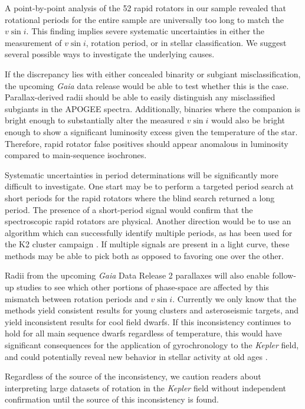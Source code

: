 \documentclass[manuscript]{aastex6}
\newcommand{\vsini}{\ensuremath{v \sin i}}
\newcommand{\Kepler}{\mbox{\textit{Kepler}}}
\newcommand{\Gaia}{\mbox{\textit{Gaia}}}
\begin{document}
A point-by-point analysis of the 52 rapid rotators in our sample revealed that
rotational periods for the entire sample are universally too long to match the 
\vsini{}. This finding implies severe systematic uncertainties in either the
measurement of \vsini{}, rotation period, or in stellar classification. We
suggest several possible ways to investigate the underlying causes.

If the discrepancy lies with either concealed binarity or subgiant
misclassification, the upcoming \Gaia{} data release would be able to
test whether this is the case. Parallax-derived radii should be able to
easily distinguish any misclassified subgiants in the APOGEE spectra.
Additionally, binaries where the companion is bright enough to
substantially alter the measured \vsini{} would also be bright enough to
show a significant luminosity excess given the temperature of the star.
Therefore, rapid rotator false positives should appear anomalous in
luminosity compared to main-sequence isochrones.

Systematic uncertainties in period determinations will be significantly more
difficult to investigate. One start may be to perform a targeted period search
at short periods for the rapid rotators where the blind search returned a long
period. The presence of a short-period signal would confirm that the
spectroscopic rapid rotators are physical. Another direction would be to use an
algorithm which can successfully identify multiple periods, as has been used
for the K2 cluster campaign \citep{Rebull16,Rebull17}. If multiple signals are
present in a light curve, these methods may be able to pick both as opposed to
favoring one over the other.

Radii from the upcoming \Gaia{} Data Release 2 parallaxes will also enable 
follow-up studies to see which other portions of phase-space are affected by 
this mismatch between rotation periods and \vsini{}. Currently we only know 
that the methods yield consistent results for young clusters and 
asteroseismic targets, and yield inconsistent results for cool field dwarfs. If
this inconsistency continues to hold for all main sequence dwarfs regardless of
temperature, this would have significant consequences for the application of
gyrochronology to the \Kepler{} field, and could potentially reveal new
behavior in stellar activity at old ages \citep{vanSaders16}.

Regardless of the source of the inconsistency, we caution readers about 
interpreting large datasets of rotation in the \Kepler{} field without 
independent confirmation until the source of this inconsistency is found.




\end{document}
